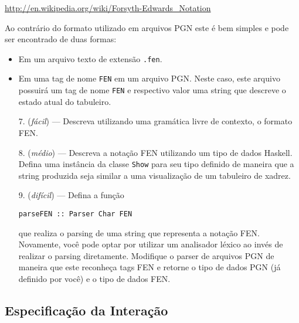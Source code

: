 \documentclass[11pt,a4paper]{article}
\begin{document}
\begin{center}
	\href{http://en.wikipedia.org/wiki/Forsyth-Edwards\_Notation}
	     {http://en.wikipedia.org/wiki/Forsyth-Edwards\_Notation}
\end{center}
Ao contr\'ario do formato utilizado em arquivos PGN este \'e bem simples e pode ser encontrado de duas formas:
\begin{itemize}
	\item Em um arquivo texto de extens\~ao \texttt{.fen}.
	\item Em uma tag de nome \texttt{FEN} em um arquivo PGN. Neste caso, este arquivo possuir\'a um tag de nome 
	      \texttt{FEN} e respectivo valor uma string que descreve o estado atual do tabuleiro. 
\end{itemize}

\begin{itemize}
	\item [7. ] (\emph{f\'acil}) --- Descreva utilizando uma gram\'atica livre de contexto, o formato FEN.
	\item [8. ] (\emph{m\'edio}) --- Descreva a nota\c{c}\~ao FEN utilizando um tipo de dados Haskell. Defina
	            uma inst\^ancia da classe \texttt{Show} para seu tipo definido de maneira que a string produzida
	            seja similar a uma visualiza\c{c}\~ao de um tabuleiro de xadrez.
	\item [9. ] (\emph{dif\'icil}) --- Defina a fun\c{c}\~ao
	\begin{center}
		\texttt{parseFEN :: Parser Char FEN}
	\end{center}
	que realiza o parsing de uma string que representa a nota\c{c}\~ao FEN. Novamente, voc\^e pode optar por
	utilizar um analisador l\'exico ao inv\'es de realizar o parsing diretamente. Modifique o parser de arquivos
	PGN de maneira que este reconhe\c{c}a tags FEN e retorne o tipo de dados PGN (j\'a definido por voc\^e) e o
	tipo de dados FEN.
\end{itemize}

\subsection{Especifica\c{c}\~ao da Intera\c{c}\~ao}
\end{document}
